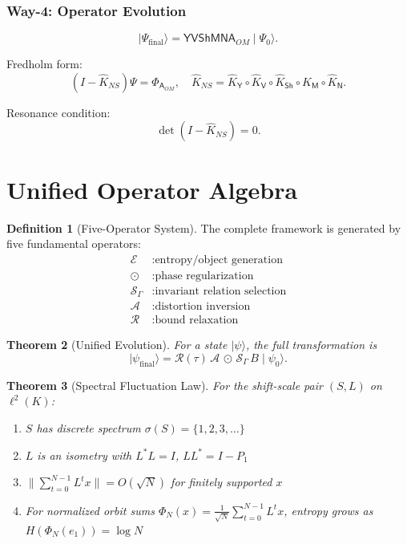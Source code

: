 \documentclass[12pt, reqno]{amsart}
\theoremstyle{plain}
\newtheorem{theorem}{Theorem}[section]
\theoremstyle{definition}
\newtheorem{definition}[theorem]{Definition}
\theoremstyle{remark}
\newcommand{\seam}{\Gamma}
\newcommand{\bindu}{\odot}
\newcommand{\seamop}{\mathcal{S}_{\seam}}
\newcommand{\release}{\mathcal{R}}
\newcommand{\aghora}{\mathcal{A}}
\newcommand{\entropy}{\mathcal{E}}
\newcommand{\bond}{B}
\newcommand{\shift}{L}
\newcommand{\scale}{S}
\newcommand{\OM}{\mathsf{A}_{OM}}
\newcommand{\NA}{\mathsf{N}}
\newcommand{\MA}{\mathsf{M}}
\newcommand{\SHI}{\mathsf{Sh}}
\newcommand{\VA}{\mathsf{V}}
\newcommand{\YA}{\mathsf{Y}}
\begin{document}
\subsubsection{Way-4: Operator Evolution}

\[
\mid \Psi_{\text{final}}\rangle = \YA \VA \SHI \MA \NA \OM \mid \Psi_0\rangle.
\]

Fredholm form:
\[
(I - \widehat{K}_{NS})\Psi = \Phi_{\OM}, \quad \widehat{K}_{NS} = \widehat{K}_{\YA} \circ \widehat{K}_{\VA} \circ \widehat{K}_{\SHI} \circ \widehat{K}_{\MA} \circ \widehat{K}_{\NA}.
\]

Resonance condition:
\[
\det(I - \widehat{K}_{NS}) = 0.
\]

\section{Unified Operator Algebra}

\begin{definition}[Five-Operator System]
The complete framework is generated by five fundamental operators:
\begin{align*}
\entropy &: \text{entropy/object generation} \\
\bindu &: \text{phase regularization} \\
\seamop &: \text{invariant relation selection} \\
\aghora &: \text{distortion inversion} \\
\release &: \text{bound relaxation}
\end{align*}
\end{definition}

\begin{theorem}[Unified Evolution]
For a state $\mid \psi\rangle$, the full transformation is
\[
\mid \psi_{\text{final}}\rangle = \release(\tau)\,\aghora\,\bindu\,\seamop\,\bond \mid \psi_0\rangle.
\]
\end{theorem}

\begin{theorem}[Spectral Fluctuation Law]
For the shift-scale pair $(\scale,\shift)$ on $\ell^2(K)$:
\begin{enumerate}
    \item $\scale$ has discrete spectrum $\sigma(\scale) = \{1,2,3,\ldots\}$
    \item $\shift$ is an isometry with $\shift^*\shift = I$, $\shift\shift^* = I - P_1$
    \item $\|\sum_{t=0}^{N-1}\shift^t x\| = O(\sqrt{N})$ for finitely supported $x$
    \item For normalized orbit sums $\Phi_N(x) = \frac{1}{\sqrt{N}}\sum_{t=0}^{N-1}\shift^t x$,
          entropy grows as $H(\Phi_N(e_1)) = \log N$
\end{enumerate}
\end{theorem}
\end{document}

